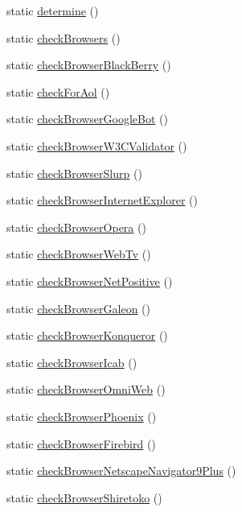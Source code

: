 \begin{DoxyCompactItemize}
\item 
static \hyperlink{class_browser_a8234c2daaab9d48ece098069716b9f32}{determine} ()
\item 
static \hyperlink{class_browser_ab3d4858d6846083953786e2eae2e8982}{checkBrowsers} ()
\item 
static \hyperlink{class_browser_a1ef80f5f801a3bda10eb279d668bd688}{checkBrowserBlackBerry} ()
\item 
static \hyperlink{class_browser_af753c52f1c70cd37f80142dcaaa293f4}{checkForAol} ()
\item 
static \hyperlink{class_browser_a7af45000d28501bacc88fcf80501f0ea}{checkBrowserGoogleBot} ()
\item 
static \hyperlink{class_browser_a3f1bb2bd3dcd53fc2385ddbbb735e2bf}{checkBrowserW3CValidator} ()
\item 
static \hyperlink{class_browser_ab9a3a40ea883bc2c2af84e71305841b9}{checkBrowserSlurp} ()
\item 
static \hyperlink{class_browser_af762d8bd6a45d7e57dd401e607113a5d}{checkBrowserInternetExplorer} ()
\item 
static \hyperlink{class_browser_a8b0873c4dc738ad593bc5d4f7056842d}{checkBrowserOpera} ()
\item 
static \hyperlink{class_browser_a0454c4481d297b7537fe487c36ba0a58}{checkBrowserWebTv} ()
\item 
static \hyperlink{class_browser_a455b9b13d2c2228ff7197e10a3c08157}{checkBrowserNetPositive} ()
\item 
static \hyperlink{class_browser_ab56b14200a94a6760a25bad2b3418c68}{checkBrowserGaleon} ()
\item 
static \hyperlink{class_browser_a326f78082e988a653d3237edc347d2fd}{checkBrowserKonqueror} ()
\item 
static \hyperlink{class_browser_a272d8ba800d1806f0d1197e778d7d0b8}{checkBrowserIcab} ()
\item 
static \hyperlink{class_browser_a9c98029e9b56ef9a775e4df936379642}{checkBrowserOmniWeb} ()
\item 
static \hyperlink{class_browser_ace991471f7e9bc5460dbd1d725c6da5d}{checkBrowserPhoenix} ()
\item 
static \hyperlink{class_browser_ae369a6e528caf131414f248402e41c5d}{checkBrowserFirebird} ()
\item 
static \hyperlink{class_browser_a4e433c07da02a557d4149a490f846270}{checkBrowserNetscapeNavigator9Plus} ()
\item 
static \hyperlink{class_browser_aed94a382661ec5d5828e2c243ce360bf}{checkBrowserShiretoko} ()

\end{DoxyCompactItemize}
